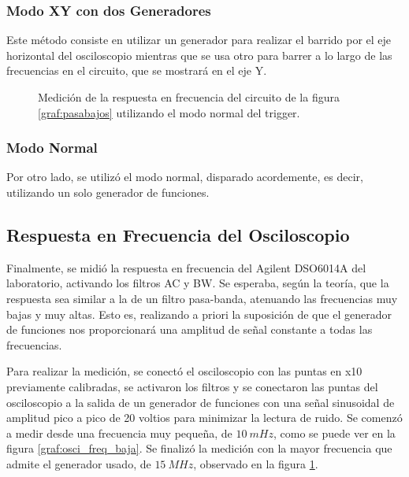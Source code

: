 \documentclass[a4paper]{article}
\begin{document}
\subsubsection*{Modo XY con dos Generadores}
Este método consiste en utilizar un generador para realizar el barrido por el eje horizontal del osciloscopio mientras que se usa otro para barrer a lo largo de las frecuencias en el circuito, que se mostrará en el eje Y.

\begin{figure}[H]
	\centering
	\caption{Medición de la respuesta en frecuencia del circuito de la figura \ref{graf:pasabajos} utilizando el modo normal del trigger.} 
	\label{graf:osci_freq_alta}
\end{figure}

\subsubsection*{Modo Normal}
Por otro lado, se utilizó el modo normal, disparado acordemente, es decir, utilizando un solo generador de funciones.

\subsection*{Respuesta en Frecuencia del Osciloscopio}
Finalmente, se midió la respuesta en frecuencia del Agilent DSO6014A del laboratorio, activando los filtros AC y BW. Se esperaba, según la teoría, que la respuesta sea similar a la de un filtro pasa-banda, atenuando las frecuencias muy bajas y muy altas. Esto es, realizando a priori la suposición de que el generador de funciones nos proporcionará una amplitud de señal constante a todas las frecuencias.

Para realizar la medición, se conectó el osciloscopio con las puntas en x10 previamente calibradas, se activaron los filtros y se conectaron las puntas del osciloscopio a la salida de un generador de funciones con una señal sinusoidal de amplitud pico a pico de 20 voltios para minimizar la lectura de ruido. Se comenzó a medir desde una frecuencia muy pequeña, de $10 \ mHz$, como se puede ver en la figura \ref{graf:osci_freq_baja}. Se finalizó la medición con la mayor frecuencia que admite el generador usado, de $15 \ MHz$, observado en la figura \ref{graf:osci_freq_alta}.
\end{document}
